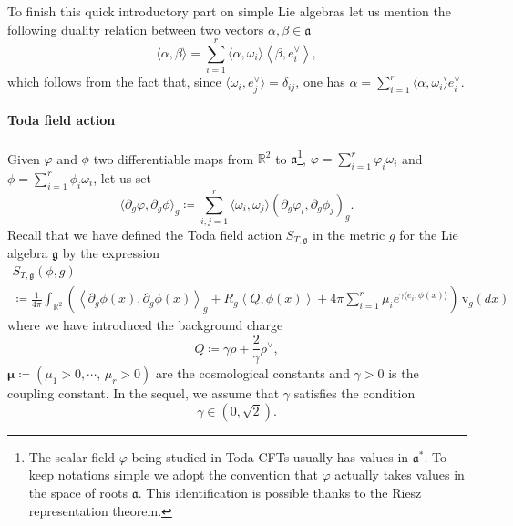 \documentclass[10pt]{amsart}
\theoremstyle{definition}\newtheorem{defi}[theo]{Definition}\newtheorem{rema}[theo]{Remark}\newtheorem{exam}[theo]{Example}\newtheorem{exem}[theo]{Example}\newtheorem{nota}[theo]{Notation}
\newcommand{\frkg}{\mathfrak{g}}
\newcommand{\frka}{\mathfrak{a}}
\newcommand{\rmv}{\mathrm{v}}
\newcommand{\R}{\mathbb{R}}
\newcommand{\ps}[1]{\langle #1 \rangle}
\newcommand*\green[1]{#1}
\begin{document}
To finish this quick introductory part on simple Lie algebras let us mention the following duality relation between two vectors $\alpha,\beta\in\frka$
\begin{equation}\label{dual}
\langle\alpha, \beta \rangle= \sum_{i=1}^{r} \langle\alpha,\omega_i \rangle \left\langle\beta,e_i^{\vee} \right\rangle,
\end{equation}
which follows from the fact that, since $\ps{\omega_i,e_j^\vee}=\delta_{ij}$, one has $\alpha=\sum_{i=1}^r\ps{\alpha,\omega_i}e_i^\vee$.

\paragraph{Toda field action}
Given $\varphi$ and $\phi$ two differentiable maps from $\R^2$ to $\frka$\footnote{The scalar field $\varphi$ being studied in Toda CFTs usually has values in $\frka^*$. To keep notations simple we adopt the convention that $\varphi$ actually takes values in the space of roots $\frka$. This identification is possible thanks to the Riesz representation theorem.}, $\varphi=\sum_{i=1}^{r}\varphi_i \omega_i$ and $\phi=\sum_{i=1}^{r}\phi_i\omega_i$, let us set
\begin{equation}\label{defscalar}
\langle\partial_g\varphi,\partial_g\phi \rangle_g\coloneqq \sum_{i,j=1}^{r} \langle \omega_i,\omega_j \rangle(\partial_g\varphi_i,\partial_g\phi_j)_g.
\end{equation}
Recall that we have defined the Toda field action $S_{T,\frkg}$ in the metric $g$ for the Lie algebra $\frkg$ by the expression
\begin{multline}
S_{T,\frkg}(\phi,g)\\
\coloneqq \frac{1}{4\pi} \int_{\R^2} \left (\left\langle\partial_{g} \phi(x), \partial_{g} \phi(x) \right\rangle_{g} +R_g \left\langle Q, \phi(x) \right\rangle +4\pi \sum_{i=1}^{r} \mu_i e^{\gamma \langle e_i,\green\phi(x) \rangle} \right)\,\rmv_{g}(dx)
\end{multline}
where we have introduced the background charge
\begin{equation}
Q\coloneqq \gamma\rho+\frac2\gamma\rho^\vee,
\end{equation}
$\bm \mu\coloneqq (\mu_1>0,\cdots,\,\mu_r>0)$ are the cosmological constants and $\gamma >0$ is the coupling constant. In the sequel, we assume that $\gamma$ satisfies the condition
\begin{equation}\label{condgamma}
\gamma \in \left(0,\sqrt{2}\right).
\end{equation}
\end{document}
